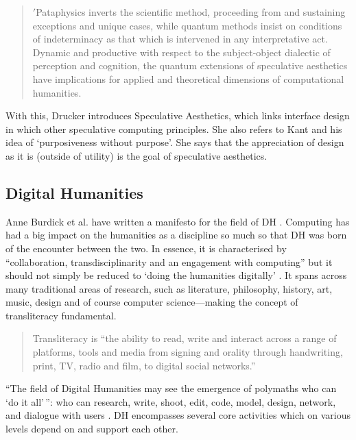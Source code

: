 \begin{quotation}
  $'$Pataphysics inverts the scientific method, proceeding from and sustaining exceptions and unique cases, while quantum methods insist on conditions of indeterminacy as that which is intervened in any interpretative act. Dynamic and productive with respect to the subject-object dialectic of perception and cognition, the quantum extensions of speculative aesthetics have implications for applied and theoretical dimensions of computational humanities. 
\end{quotation}

With this, Drucker introduces Speculative Aesthetics, which links interface design in which other speculative computing principles. She also refers to Kant and his idea of `purposiveness without purpose'. She says that the appreciation of design as it is (outside of utility) is the goal of speculative aesthetics.


\subsection{Digital Humanities}
\label{s:digithuman}

Anne Burdick et al. have written a manifesto for the field of \ac{DH} \citeyear{Burdick2012}. Computing has had a big impact on the humanities as a discipline so much so that \ac{DH} was born of the encounter between the two. In essence, it is characterised by ``collaboration, transdisciplinarity and an engagement with computing'' \autocite[p.122]{Burdick2012} but it should not simply be reduced to `doing the humanities digitally' \autocite[p.101]{Burdick2012}. It spans across many traditional areas of research, such as literature, philosophy, history, art, music, design and of course computer science---making the concept of transliteracy fundamental.

\begin{quotation}
  Transliteracy is ``the ability to read, write and interact across a range of platforms, tools and media from signing and orality through handwriting, print, TV, radio and film, to digital social networks.'' 
\end{quotation}

``The field of Digital Humanities may see the emergence of polymaths who can `do it all'\,'': who can research, write, shoot, edit, code, model, design, network, and dialogue with users \autocite[p.15]{Burdick2012}. \ac{DH} encompasses several core activities which on various levels depend on and support each other.

